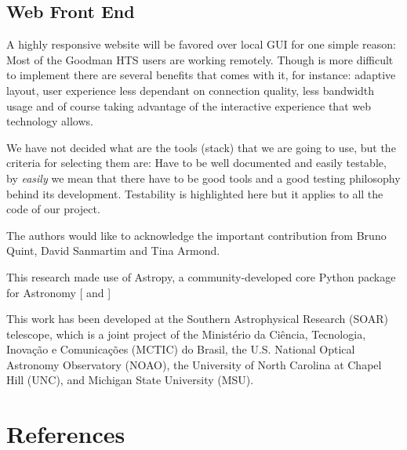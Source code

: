 \documentclass[11pt,twoside]{article}
\begin{document}
\subsection{Web Front End}
A highly responsive website will be favored over local GUI for one simple reason: Most of the Goodman HTS users are working remotely. Though is more difficult to implement there are several benefits that comes with it, for instance: adaptive layout, user experience less dependant on connection quality, less bandwidth usage and of course taking advantage of the interactive experience that web technology allows.

We have not decided what are the tools (stack) that we are going to use, but the criteria for selecting them are: Have to be well documented and easily testable, by \emph{easily} we mean that there have to be good tools and a good testing philosophy behind its development. Testability is highlighted here but it applies to all the code of our project.


\acknowledgements

The authors would like to acknowledge the important contribution from Bruno Quint, David Sanmartim and Tina Armond.

This research made use of Astropy, a community-developed core Python package for Astronomy [\citet{2013A&A...558A..33A} and \citet{2018AJ....156..123A}] 

This work has been developed at the Southern Astrophysical Research (SOAR) telescope, which is a joint project of the Minist\'erio da Ci\^encia, Tecnologia, Inova\c{c}\~ao e Comunica\c{c}\~oes (MCTIC) do Brasil, the U.S. National Optical Astronomy Observatory (NOAO), the University of North Carolina at Chapel Hill (UNC), and Michigan State University (MSU). 

\section{References}


\end{document}
